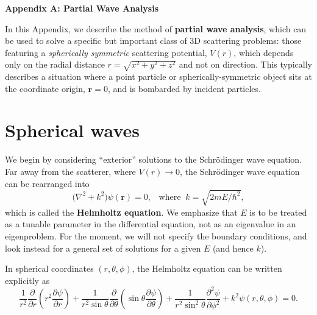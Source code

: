 \documentclass[pra,12pt]{revtex4}
\begin{document}
\begin{center}
{\large \textbf{Appendix A: Partial Wave Analysis}}
\end{center}

In this Appendix, we describe the method of \textbf{partial wave
  analysis}, which can be used to solve a specific but important class
of 3D scattering problems: those featuring a \textit{spherically
  symmetric} scattering potential, $V(r)$, which depends only on the
radial distance $r = \sqrt{x^2 + y^2 + z^2}$ and not on direction.
This typically describes a situation where a point particle or
spherically-symmetric object sits at the coordinate origin,
$\mathbf{r} = 0$, and is bombarded by incident particles.

\section{Spherical waves}
\label{sec:spherical}

We begin by considering ``exterior'' solutions to the Schr\"odinger
wave equation.  Far away from the scatterer, where $V(r) \rightarrow
0$, the Schr\"odinger wave equation can be rearranged into
$$\Big(\nabla^2 + k^2\Big) \psi(\mathbf{r}) = 0,\;\;\;\mathrm{where}\;\;k = \sqrt{2mE/\hbar^2},$$
which is called the \textbf{Helmholtz equation}.  We emphasize that
$E$ is to be treated as a tunable parameter in the differential
equation, not as an eigenvalue in an eigenproblem.  For the moment, we
will not specify the boundary conditions, and look instead for a
general set of solutions for a given $E$ (and hence $k$).

In spherical coordinates $(r,\theta,\phi)$, the Helmholtz equation can
be written explicitly as
$$\frac{1}{r^2}\frac{\partial}{\partial r}\left(r^2\frac{\partial \psi}{\partial r}\right) + \frac{1}{r^2\sin\theta}\frac{\partial}{\partial\theta}\left(\sin\theta\frac{\partial\psi}{\partial\theta}\right)+\frac{1}{r^2\sin^2\theta}\frac{\partial^2\psi}{\partial\phi^2} + k^2\psi(r,\theta,\phi) = 0.$$
\end{document}
